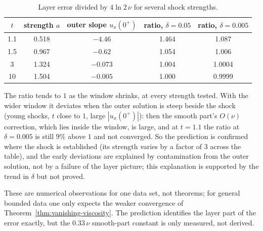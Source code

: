 \begin{table}[h]
\centering
\begin{tabular}{c c c c c}
  $t$ & strength $a$ & outer slope $u_x(0^+)$ & ratio, $\delta=0.05$ & ratio, $\delta=0.005$ \\\hline
  1.1  & 0.518 & $-4.46$  & 1.464 & 1.087 \\
  1.5  & 0.967 & $-0.62$  & 1.054 & 1.006 \\
  3    & 1.324 & $-0.073$ & 1.004 & 1.0004 \\
  10   & 1.504 & $-0.005$ & 1.000 & 0.9999
\end{tabular}
\caption{Layer error divided by $4\ln2\,\nu$ for several shock strengths.}
\label{tab:strength-independence}
\end{table}

The ratio tends to $1$ as the window shrinks, at every strength tested. With
the wider window it deviates when the outer solution is steep beside the
shock (young shocks, $t$ close to $1$, large $|u_x(0^+)|$): then the smooth
part's $O(\nu)$ correction, which lies inside the window, is large, and at
$t=1.1$ the ratio at $\delta=0.005$ is still $9\%$ above $1$ and not
converged. So the prediction is confirmed where the shock is established
(its strength varies by a factor of $3$ across the table), and the early
deviations are explained by contamination from the outer solution, not by a
failure of the layer picture; this explanation is supported by the trend in
$\delta$ but not proved.

\noindent These are numerical observations for one data set,
not theorems; for general bounded data one only expects the weaker convergence
of Theorem~\ref{thm:vanishing-viscosity}. The prediction identifies the
layer part of the error exactly, but the $0.33\,\nu$ smooth-part constant is
only measured, not derived.